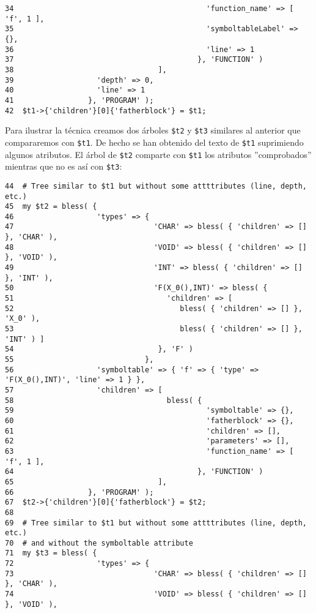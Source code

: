\begin{enumerate}
\begin{verbatim}
34                                            'function_name' => [ 'f', 1 ],
35                                            'symboltableLabel' => {},
36                                            'line' => 1
37                                          }, 'FUNCTION' )
38                                 ],
39                   'depth' => 0,
40                   'line' => 1
41                 }, 'PROGRAM' );
42  $t1->{'children'}[0]{'fatherblock'} = $t1;
\end{verbatim}
Para ilustrar la técnica creamos dos árboles \verb|$t2| y \verb|$t3| similares al anterior
que compararemos con \verb|$t1|.
De hecho se han obtenido del texto de \verb|$t1| suprimiendo algunos atributos.
El árbol de \verb|$t2| comparte con \verb|$t1| los atributos ''comprobados'' mientras 
que no es así con \verb|$t3|:
\begin{verbatim}
44  # Tree similar to $t1 but without some attttributes (line, depth, etc.)
45  my $t2 = bless( {
46                   'types' => {
47                                'CHAR' => bless( { 'children' => [] }, 'CHAR' ),
48                                'VOID' => bless( { 'children' => [] }, 'VOID' ),
49                                'INT' => bless( { 'children' => [] }, 'INT' ),
50                                'F(X_0(),INT)' => bless( {
51                                   'children' => [
52                                      bless( { 'children' => [] }, 'X_0' ),
53                                      bless( { 'children' => [] }, 'INT' ) ]
54                                 }, 'F' )
55                              },
56                   'symboltable' => { 'f' => { 'type' => 'F(X_0(),INT)', 'line' => 1 } },
57                   'children' => [
58                                   bless( {
59                                            'symboltable' => {},
60                                            'fatherblock' => {},
61                                            'children' => [],
62                                            'parameters' => [],
63                                            'function_name' => [ 'f', 1 ],
64                                          }, 'FUNCTION' )
65                                 ],
66                 }, 'PROGRAM' );
67  $t2->{'children'}[0]{'fatherblock'} = $t2;
68
69  # Tree similar to $t1 but without some attttributes (line, depth, etc.)
70  # and without the symboltable attribute
71  my $t3 = bless( {
72                   'types' => {
73                                'CHAR' => bless( { 'children' => [] }, 'CHAR' ),
74                                'VOID' => bless( { 'children' => [] }, 'VOID' ),

\end{verbatim}
\end{enumerate}
